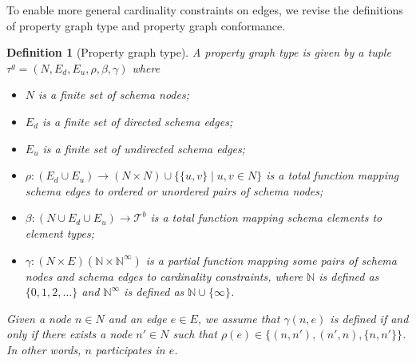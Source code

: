 \documentclass[a4paper]{article}
\makeatletter
\newtheorem{definition}[theorem]{Definition}
\newcommand{\N}{\mathbb{N}}
\newcommand{\pto}{}%
\DeclareRobustCommand{\pto}{\mathrel{\mathpalette\p@to@gets\to}}
\newcommand{\p@to@gets}[2]{%
  \ooalign{\hidewidth$\m@th#1\mapstochar\mkern5mu$\hidewidth\cr$\m@th#1\to$\cr}%
}
\newcommand{\btypes}{\mathcal{T}^b}
\newcommand{\gtype}{\tau^g}
\makeatother
\begin{document}
To enable more general cardinality constraints on edges, we revise the definitions of property graph type and property graph conformance.

\begin{definition}[Property graph type]
  A \emph{property graph type} is given by a tuple $\gtype = (N, E_d, E_u, \rho, \beta, \gamma)$ where 
  \begin{itemize}
    \item $N$ is a finite set of schema nodes;
    \item $E_d$ is a finite set of directed schema edges;
    \item $E_u$ is a finite set of undirected schema edges;
    \item $\rho : (E_d \cup E_u) \to (N \times N) \cup \{\{u, v\} \mid u, v \in N\}$ is a total function mapping schema edges to ordered or unordered pairs of schema nodes;
    \item $\beta : (N \cup E_d \cup E_u) \to \btypes$ is a total function mapping schema elements to element types;
    \item $\gamma : (N \times E) \pto (\N \times \N^\infty)$ is a partial function mapping some pairs of schema nodes and schema edges to cardinality constraints, where $\N$ is defined as $\{0, 1, 2, \ldots\}$ and $\N^\infty$ is defined as $\N \cup \{\infty\}$.
  \end{itemize}


  Given a node $n \in N$ and an edge $e \in E$, we assume that $\gamma(n, e)$ is defined if and only if there exists a node $n' \in N$ such that $\rho(e) \in \{(n, n'), (n', n), \{n, n'\}\}$. In other words, $n$ \emph{participates} in $e$.
\end{definition}
\end{document}
